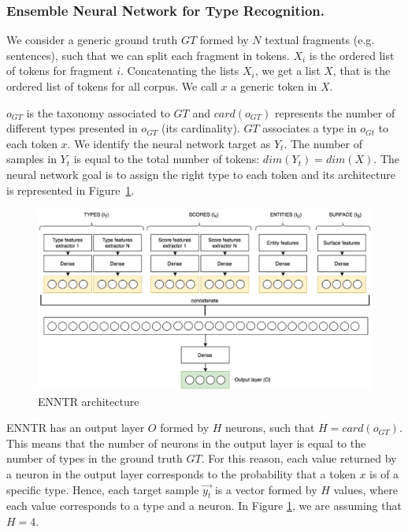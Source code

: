 \documentclass{llncs}
\begin{document}
\subsubsection{Ensemble Neural Network for Type Recognition.}
We consider a generic ground truth $GT$ formed by $N$ textual fragments (e.g. sentences), such that we can split each fragment in tokens. $X_i$ is the ordered list of tokens for fragment $i$. Concatenating the lists $X_i$, we get a list $X$, that is the ordered list of tokens for all corpus. We call $x$ a generic token in $X$. 

$o_{GT}$ is the taxonomy associated to $GT$ and $card(o_{GT})$ represents the number of different types presented in $o_{GT}$ (its cardinality). $GT$ associates a type in $o_{Gt}$ to each token $x$. We identify the neural network target as $Y_t$. The number of samples in $Y_t$ is equal to the total number of tokens: $dim(Y_t)=dim(X)$. The neural network goal is to assign the right type to each token and its architecture is represented in Figure~\ref{fig:architecture_type_recognition}. 

\begin{figure}
	\centering
    	\includegraphics[scale=0.2]{architecture_type_recognition.png}
 	\caption{ENNTR architecture}
 	\label{fig:architecture_type_recognition}
\end{figure}

ENNTR has an output layer $O$ formed by $H$ neurons, such that $H=card(o_{GT})$. This means that the number of neurons in the output layer is equal to the number of types in the ground truth $GT$. For this reason, each value returned by a neuron in the output layer corresponds to the probability that a token $x$ is of a specific type. Hence, each target sample $\vec{y_t}$ is a vector formed by $H$ values, where each value corresponds to a type and a neuron. In Figure \ref{fig:architecture_type_recognition}, we are assuming that $H = 4$.
\end{document}
